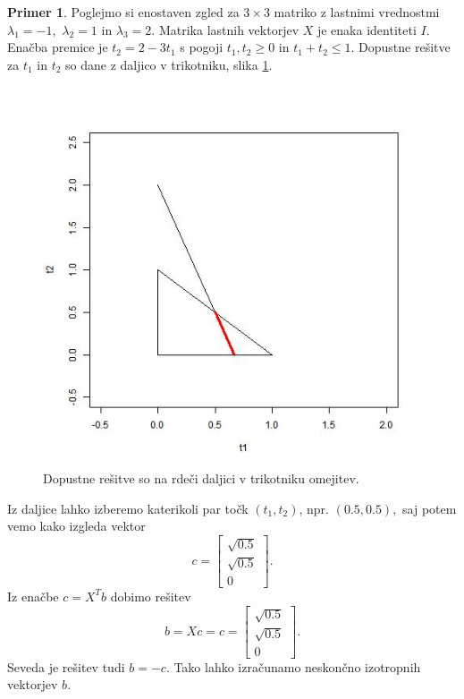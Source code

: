 \documentclass[12pt,a4paper]{amsart}
\theoremstyle{definition}
\newtheorem{primer}[definicija]{Primer}
\theoremstyle{plain}
\begin{document}
\begin{primer}
Poglejmo si enostaven zgled za $3\times 3$ matriko z lastnimi vrednostmi $\lambda_1=-1,$ $\lambda_2=1$ in $\lambda_3=2$. Matrika lastnih vektorjev $X$ je enaka identiteti $I$.\\
Enačba premice je $t_2=2-3t_1$ s pogoji $t_1, t_2 \ge 0$ in $t_1+t_2\le 1$. Dopustne rešitve za $t_1$ in $t_2$ so dane z daljico v trikotniku, slika \ref{fig:daljica}.\\
\begin{figure}[h]
\centering
\includegraphics[scale=0.4]{graf3.jpg}
\caption{Dopustne rešitve so na rdeči daljici v trikotniku omejitev.}
\label{fig:daljica}
\end{figure}

Iz daljice lahko izberemo katerikoli par točk $(t_1, t_2)$, npr. $(0.5, 0.5),$ saj potem vemo kako izgleda vektor 
$$c=\begin{bmatrix}
\sqrt{0.5}\\
\sqrt{0.5}\\
0
\end{bmatrix}.$$ 
Iz enačbe $c=X^T b$ dobimo rešitev
$$b=Xc=c =\begin{bmatrix}
\sqrt{0.5}\\
\sqrt{0.5}\\
0
\end{bmatrix}.$$
Seveda je rešitev tudi $b=-c$. Tako lahko izračunamo neskončno izotropnih vektorjev $b$.
\end{primer}
\end{document}
